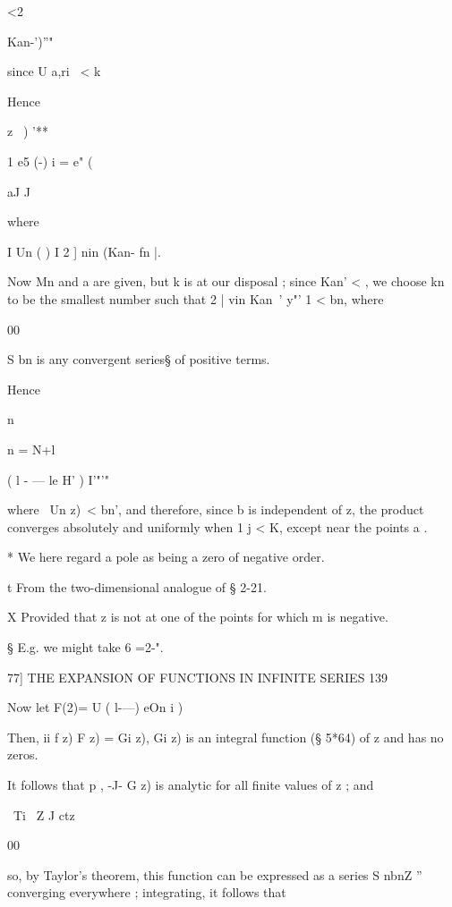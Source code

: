 <2\ \ {Kan-')''"\,



since U a,ri \ < k



Hence



z \ ) '**

1 e5 (-) i = e" (

aJ J



where



I Un ( ) I 2 ] nin (Kan- fn |.

Now Mn and a are given, but k is at our disposal ; since Kan' < , we
choose kn to be the smallest number such that 2 | vin Kan~' y"' 1 <
bn, where

00

S bn is any convergent series§ of positive terms.



Hence



n

n = N+l



 ( l - — le H' ) I'"'"






where \ Un z)\ < bn', and therefore, since b is independent of z, the
product converges absolutely and uniformly when 1 j < K, except near
the points a .



* We here regard a pole as being a zero of negative order.

t From the two-dimensional analogue of § 2-21.

X Provided that z is not at one of the points for which m is negative.

§ E.g. we might take 6 =2-".



77] THE EXPANSION OF FUNCTIONS IN INFINITE SERIES 139

Now let F(2)= U ( l-—) eOn i )

Then, ii f z) F z) = Gi z), Gi z) is an integral function (§ 5*64) of
z and has no zeros.

It follows that p , -J- G z) is analytic for all finite values of z ;
and

\ Ti \ Z J ctz

00

so, by Taylor's theorem, this function can be expressed as a series S
nbnZ ''~ converging everywhere ; integrating, it follows that

}
